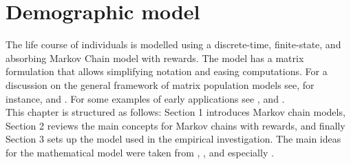 \documentclass[\main/main.tex]{subfiles}
\begin{document}
\chapter{Demographic model}

The life course of individuals is modelled using a discrete-time, finite-state, and absorbing Markov Chain model with rewards.
The model has a matrix formulation that allows simplifying notation and easing computations. For a discussion on the general framework of matrix population models see, for instance, \cite{Caswell2001} and \cite{Keyfitz2005}. For some examples of early applications see \citet{Leslie1945, Leslie1948}, \cite{Keyfitz1964} and \cite{Rogers1966}.\\

This chapter is structured as follows: Section 1 introduces Markov chain models, Section 2 reviews the main concepts for Markov chains with rewards, and finally Section 3 sets up the model used in the empirical investigation.
The main ideas for the mathematical model were taken from \cite{Caswell2006}, \cite{VanDaalen2017}, and especially \cite{Caswell2018}.







\end{document}
